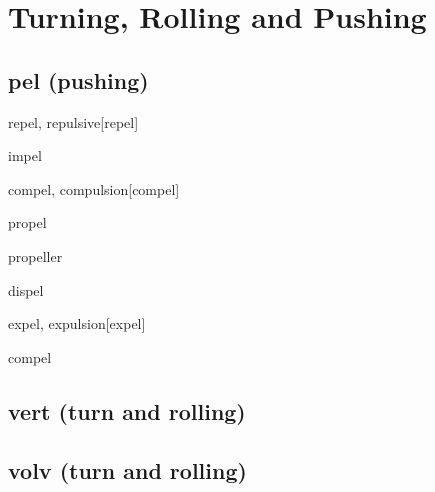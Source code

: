 \chapter{Turning, Rolling and Pushing}

\section{pel (pushing)}

\begin{word}{repel, repulsive}[repel]
\end{word}

\begin{word}{impel}
\end{word}

\begin{word}{compel,  compulsion}[compel]
\end{word}

\begin{word}{propel}
 \end{word}


\begin{word}{propeller}
\end{word}

\begin{word}{dispel}
\end{word}

\begin{word}{expel, expulsion}[expel]
\end{word}

\begin{word}{compel}
\end{word}








\section{vert (turn and rolling)}




\section{volv (turn and rolling)}